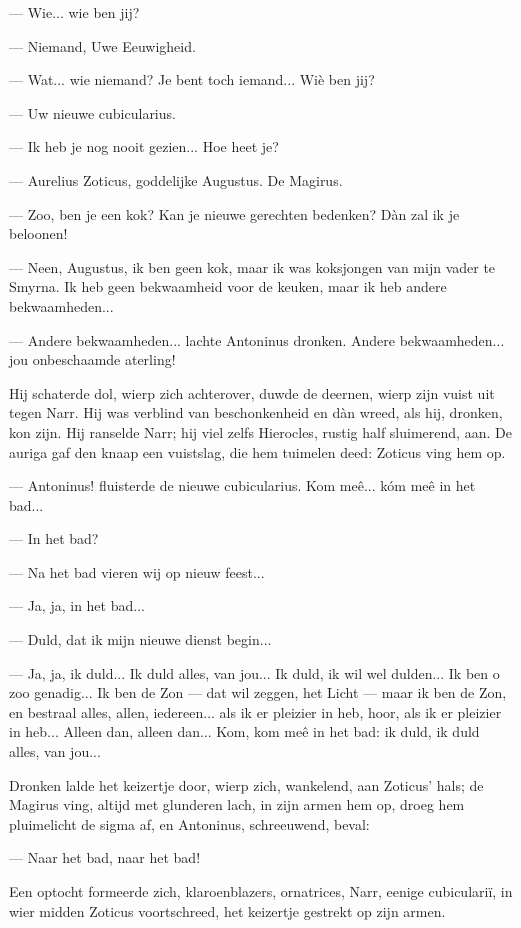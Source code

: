 \documentclass[a4paper, 12pt, oneside, dutch]{article}
\begin{document}
--- Wie... wie ben jij?

--- Niemand, Uwe Eeuwigheid.

--- Wat... wie niemand? Je bent toch iemand... Wiè ben jij?

--- Uw nieuwe cubicularius.

--- Ik heb je nog nooit gezien... Hoe heet je?

--- Aurelius Zoticus, goddelijke Augustus. De Magirus.

--- Zoo, ben je een kok? Kan je nieuwe gerechten bedenken? Dàn zal ik je beloonen!

--- Neen, Augustus, ik ben geen kok, maar ik was koksjongen van mijn vader te Smyrna. Ik heb geen bekwaamheid voor de keuken, maar ik heb andere bekwaamheden...

--- Andere bekwaamheden... lachte Antoninus dronken. Andere bekwaamheden... jou onbeschaamde aterling!

Hij schaterde dol, wierp zich achterover, duwde de deernen, wierp zijn vuist uit tegen Narr. Hij was verblind van beschonkenheid en dàn wreed, als hij, dronken, kon zijn. Hij ranselde Narr; hij viel zelfs Hierocles, rustig half sluimerend, aan. De auriga gaf den knaap een vuistslag, die hem tuimelen deed: Zoticus ving hem op.

--- Antoninus! fluisterde de nieuwe cubicularius. Kom meê... kóm meê in het bad...

--- In het bad?

--- Na het bad vieren wij op nieuw feest...

--- Ja, ja, in het bad...

--- Duld, dat ik mijn nieuwe dienst begin...

--- Ja, ja, ik duld... Ik duld alles, van jou... Ik duld, ik wil wel dulden... Ik ben o zoo genadig... Ik ben de Zon --- dat wil zeggen, het Licht --- maar ik ben de Zon, en bestraal alles, allen, iedereen... als ik er pleizier in heb, hoor, als ik er pleizier in heb... Alleen dan, alleen dan... Kom, kom meê in het bad: ik duld, ik duld alles, van jou...

Dronken lalde het keizertje door, wierp zich, wankelend, aan Zoticus' hals; de Magirus ving, altijd met glunderen lach, in zijn armen hem op, droeg hem pluimelicht de sigma af, en Antoninus, schreeuwend, beval:

--- Naar het bad, naar het bad!

Een optocht formeerde zich, klaroenblazers, ornatrices, Narr, eenige cubiculariï, in wier midden Zoticus voortschreed, het keizertje gestrekt op zijn armen.
\end{document}
